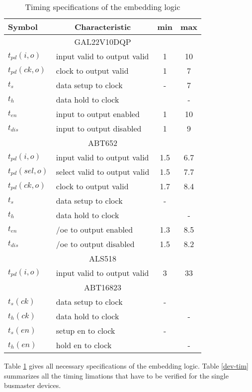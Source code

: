 \documentclass[12pt]{article}
\newcommand{\btab}[1]{\begin{table}\begin{center}\begin{tabular}{#1}}
\newcommand{\etab}[2]{\end{tabular}\caption{\label{#1} #2}%
                      \end{center}\end{table}}
\begin{document}
\btab{|l|l|c|c|}
\hline
Symbol & \multicolumn{1}{c|}{Characteristic} & min & max \\
\hline\hline
\multicolumn{4}{c}{GAL22V10DQP} \\ \hline\hline
$t_{pd}(i,o)$ & input valid to output valid & 1 & 10 \\ \hline
$t_{pd}(ck,o)$ & clock to output valid & 1 & 7 \\ \hline
$t_s$ & data setup to clock & - & 7 \\ \hline
$t_h$ & data hold to clock & & - \\ \hline
$t_{en}$ & input to output enabled & 1 & 10 \\ \hline
$t_{dis}$ & input to output disabled & 1 & 9 \\ \hline\hline
\multicolumn{4}{c}{ABT652} \\ \hline\hline
$t_{pd}(i,o)$ & input valid to output valid & 1.5 & 6.7 \\ \hline
$t_{pd}(sel,o)$ & select valid to output valid & 1.5 & 7.7 \\ \hline
$t_{pd}(ck,o)$ & clock to output valid & 1.7 & 8.4 \\ \hline
$t_s$ & data setup to clock & - &  \\ \hline
$t_h$ & data hold to clock & & - \\ \hline
$t_{en}$ & /oe to output enabled & 1.3 & 8.5 \\ \hline
$t_{dis}$ & /oe to output disabled & 1.5 & 8.2 \\ \hline\hline
\multicolumn{4}{c}{ALS518} \\ \hline\hline
$t_{pd}(i,o)$ & input valid to output valid & 3 & 33 \\ \hline\hline
\multicolumn{4}{c}{ABT16823} \\ \hline\hline
$t_s(ck)$ & data setup to clock & - &  \\ \hline
$t_h(ck)$ & data hold to clock & & - \\ \hline
$t_s(en)$ & setup en to clock & - &  \\ \hline
$t_h(en)$ & hold en to clock & & - \\ \hline
\etab{logic-tim}{Timing specifications of the embedding logic}

Table \ref{logic-tim} gives all necessary specifications of the
embedding logic. Table \ref{dev-tim} summarizes all the timing
limations that have to be verified for the single busmaster devices.
\end{document}

